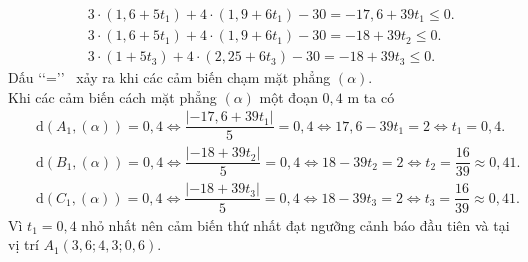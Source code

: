 \begin{ex}
{		\begin{eqnarray*}
			&& 3 \cdot (1{,}6+5t_1)+4 \cdot (1{,}9+6t_1)-30=-17{,}6+39t_1 \le 0. \\
			&& 3 \cdot (1{,}6+5t_1)+4 \cdot (1{,}9+6t_1)-30=-18+39t_2 \le 0. \\
			&& 3 \cdot (1+5t_3)+4 \cdot (2{,}25+6t_3)-30=-18+39t_3 \le 0.
		\end{eqnarray*}
		Dấu \lq\lq =\rq\rq~ xảy ra khi các cảm biến chạm mặt phẳng $(\alpha)$. \\ 
		Khi các cảm biến cách mặt phẳng $(\alpha)$ một đoạn $0{,}4$ m ta có
		\begin{eqnarray*}
			&& \mathrm{d}\left(A_1,(\alpha)\right)=0{,}4 \Leftrightarrow \dfrac{\left|-17{,}6+39t_1\right|}{5}=0{,}4 \Leftrightarrow 17{,}6-39t_1=2 \Leftrightarrow t_1=0{,}4. \\
			&& \mathrm{d}\left(B_1,(\alpha)\right)=0{,}4 \Leftrightarrow \dfrac{\left|-18+39t_2\right|}{5}=0{,}4 \Leftrightarrow 18-39t_2=2 \Leftrightarrow t_2=\dfrac{16}{39} \approx 0{,}41. \\
			&& \mathrm{d}\left(C_1,(\alpha)\right)=0{,}4 \Leftrightarrow \dfrac{\left|-18+39t_3\right|}{5}=0{,}4 \Leftrightarrow 18-39t_3=2 \Leftrightarrow t_3=\dfrac{16}{39} \approx 0{,}41.
		\end{eqnarray*}
		Vì $t_1=0{,}4$ nhỏ nhất nên cảm biến thứ nhất đạt ngưỡng cảnh báo đầu tiên và tại vị trí $A_1\left(3{,}6;4{,}3;0{,}6\right)$.
	} 
\end{ex}
